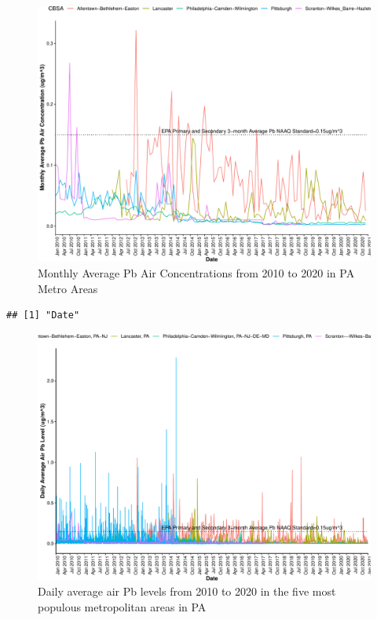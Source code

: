 \documentclass[
  12pt,
]{article}
\begin{document}
\begin{figure}

\includegraphics{Alcorn_Bao_Hermanson_ENV872_Project_files/figure-latex/time-series-visuals-1} \hfill{}

\caption{Monthly Average Pb Air Concentrations from 2010 to 2020 in PA Metro Areas}\label{fig:time-series-visuals}
\end{figure}

\begin{verbatim}
## [1] "Date"
\end{verbatim}

\begin{figure}

\includegraphics{Alcorn_Bao_Hermanson_ENV872_Project_files/figure-latex/linear-interp-visual-1} \hfill{}

\caption{Daily average air Pb levels from 2010 to 2020 in the five most populous metropolitan areas in PA}\label{fig:linear-interp-visual}
\end{figure}
\end{document}

